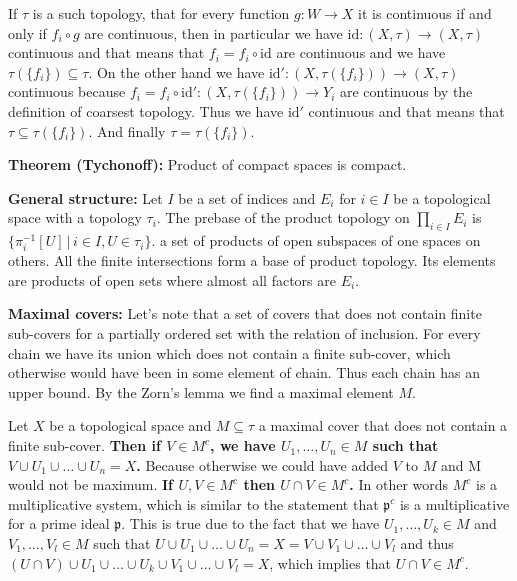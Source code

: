 \documentclass{article}
\begin{document}
If $\tau$ is a such topology, that for every function $g:W\rightarrow X$ it is
continuous if and only if $f_i\circ g$ are continuous, then in particular we
have $\text{id}:(X,\tau)\rightarrow(X,\tau)$ continuous and that means that $f_i = f_i\circ
\text{id}$ are continuous and we have $\tau(\{f_i\})\subseteq\tau$. On the other
hand we have $\text{id}':(X,\tau(\{f_i\}))\rightarrow(X,\tau)$ continuous
because $f_i = f_i\circ\text{id}':(X,\tau(\{f_i\}))\rightarrow Y_i$ are continuous
by the definition of coarsest topology. Thus we have $\text{id}'$ continuous
and that means that $\tau\subseteq\tau(\{f_i\})$. And finally $\tau=\tau(\{f_i\})$.

\vspace{1ex}

\textbf{Theorem (Tychonoff):} Product of compact spaces is compact.
\vspace{1ex}

\textbf{General structure:} Let $I$ be a set of indices and $E_i$ for $i\in I$
be a topological space with a topology $\tau_i$. The prebase of the product
topology on  $\prod_{i\in I} E_i$ is $\{\pi_i^{-1}[U]\,|\,i\in I,U\in\tau_i\}$.
a set of products of open subspaces of one spaces on others. All the finite
intersections form a base of product topology. Its elements are products of
open sets where almost all factors are $E_i$.
\vspace{1ex}

\textbf{Maximal covers:} Let's note that a set of covers that does not contain
finite sub-covers for a partially ordered set with the relation of inclusion.
For every chain we have its union which does not contain a finite sub-cover,
which otherwise would have been in some element of chain. Thus each chain has an
upper bound. By the Zorn's lemma we find a maximal element $M$.
\vspace{1ex}

Let $X$ be a topological space and $M\subseteq\tau$ a maximal cover that does
not contain a finite sub-cover. \textbf{Then if $V\in M^c$, we have $U_1,\ldots,
U_n\in M$ such that $V\cup U_1\cup\ldots\cup U_n=X$.} Because otherwise we
could have added $V$ to $M$ and M would not be maximum. \textbf{If
$U,V\in M^c$ then $U\cap V\in M^c$.} In other words $M^c$ is a multiplicative
system, which is similar to the statement that $\mathfrak{p}^c$ is a multiplicative
for a prime ideal $\mathfrak{p}$. This is true due to the fact that we have
$U_1,\ldots,U_k\in M$ and $V_1,\ldots,V_l\in M$ such that $U\cup U_1\cup\ldots
\cup U_n = X = V\cup V_1\cup\ldots\cup V_l$ and thus $(U\cap V)\cup U_1\cup\ldots
\cup U_k\cup V_1\cup\ldots\cup V_l=X$, which implies that $U\cap V\in M^c$.
\vspace{1ex}
\end{document}
